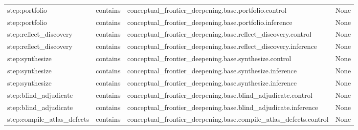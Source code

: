 \documentclass[10pt,a4paper]{article}
\begin{document}
\begin{longtable}{@{}>{\raggedright\arraybackslash}p{.24\linewidth}>{\raggedright\arraybackslash}p{.12\linewidth}>{\raggedright\arraybackslash}p{.24\linewidth}>{\raggedright\arraybackslash}p{.20\linewidth}@{}}
step:\allowbreak{}portfolio & contains & conceptual\allowbreak{}\_\allowbreak{}frontier\_\allowbreak{}deepening.\allowbreak{}base.\allowbreak{}portfolio.\allowbreak{}control & None\\
step:\allowbreak{}portfolio & contains & conceptual\allowbreak{}\_\allowbreak{}frontier\_\allowbreak{}deepening.\allowbreak{}base.\allowbreak{}portfolio.\allowbreak{}inference & None\\
step:\allowbreak{}reflect\_\allowbreak{}discovery & contains & conceptual\allowbreak{}\_\allowbreak{}frontier\_\allowbreak{}deepening.\allowbreak{}base.\allowbreak{}reflect\_\allowbreak{}discovery.\allowbreak{}control & None\\
step:\allowbreak{}reflect\_\allowbreak{}discovery & contains & conceptual\allowbreak{}\_\allowbreak{}frontier\_\allowbreak{}deepening.\allowbreak{}base.\allowbreak{}reflect\_\allowbreak{}discovery.\allowbreak{}inference & None\\
step:\allowbreak{}synthesize\allowbreak{} & contains & conceptual\allowbreak{}\_\allowbreak{}frontier\_\allowbreak{}deepening.\allowbreak{}base.\allowbreak{}synthesize\allowbreak{}.\allowbreak{}control & None\\
step:\allowbreak{}synthesize\allowbreak{} & contains & conceptual\allowbreak{}\_\allowbreak{}frontier\_\allowbreak{}deepening.\allowbreak{}base.\allowbreak{}synthesize\allowbreak{}.\allowbreak{}inference & None\\
step:\allowbreak{}synthesize\allowbreak{} & contains & conceptual\allowbreak{}\_\allowbreak{}frontier\_\allowbreak{}deepening.\allowbreak{}base.\allowbreak{}synthesize\allowbreak{}.\allowbreak{}inference & None\\
step:\allowbreak{}blind\_\allowbreak{}adjudicate\allowbreak{} & contains & conceptual\allowbreak{}\_\allowbreak{}frontier\_\allowbreak{}deepening.\allowbreak{}base.\allowbreak{}blind\_\allowbreak{}adjudicate\allowbreak{}.\allowbreak{}control & None\\
step:\allowbreak{}blind\_\allowbreak{}adjudicate\allowbreak{} & contains & conceptual\allowbreak{}\_\allowbreak{}frontier\_\allowbreak{}deepening.\allowbreak{}base.\allowbreak{}blind\_\allowbreak{}adjudicate\allowbreak{}.\allowbreak{}inference & None\\
step:\allowbreak{}compile\_\allowbreak{}atlas\_\allowbreak{}defects & contains & conceptual\allowbreak{}\_\allowbreak{}frontier\_\allowbreak{}deepening.\allowbreak{}base.\allowbreak{}compile\_\allowbreak{}atlas\_\allowbreak{}defects.\allowbreak{}control & None\\

\end{longtable}
\end{document}

